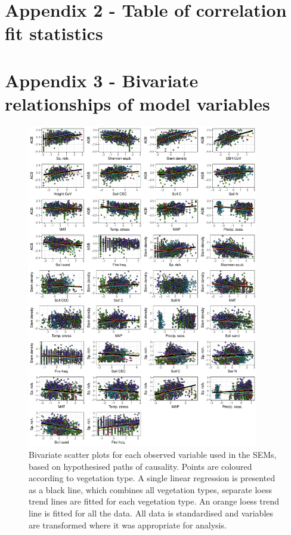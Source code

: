 \documentclass[11pt,a4paper]{article}
\begin{document}
\section{Appendix 2 - Table of correlation fit statistics} \label{appendixb}



\section{Appendix 3 - Bivariate relationships of model variables} \label{appendixc}

\begin{figure}[H]
\centering
	\includegraphics[width=0.9\textwidth]{bivar_lm}
	\caption{Bivariate scatter plots for each observed variable used in the SEMs, based on hypothesised paths of causality. Points are coloured according to vegetation type. A single linear regression is presented as a black line, which combines all vegetation types, separate loess trend lines are fitted for each vegetation type. An orange loess trend line is fitted for all the data. All data is standardised and variables are transformed where it was appropriate for analysis.}
	\label{bivar_lm}
\end{figure}
\end{document}
